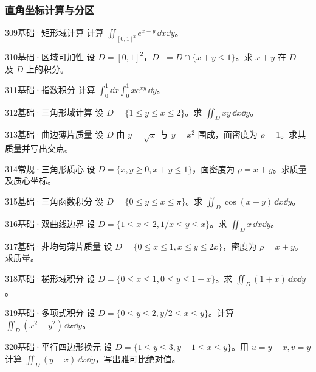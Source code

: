 \subsubsection{直角坐标计算与分区}
\begin{exercise}{309}{基础·矩形域计算}
计算 $\iint_{[0,1]^2}e^{x-y}\,\dd x\dd y$。
\end{exercise}
\begin{exercise}{310}{基础·区域可加性}
设 $D=[0,1]^2$，$D_-=D\cap\{x+y\leq1\}$。求 $x+y$ 在 $D_-$ 及 $D$ 上的积分。
\end{exercise}
\begin{exercise}{311}{基础·指数积分}
计算 $\int_0^1\dd x\int_0^1xe^{xy}\,\dd y$。
\end{exercise}
\begin{exercise}{312}{基础·三角形域计算}
设 $D=\{1\leq y\leq x\leq2\}$。求 $\iint_Dxy\,\dd x\dd y$。
\end{exercise}
\begin{exercise}{313}{基础·曲边薄片质量}
设 $D$ 由 $y=\sqrt{x}$ 与 $y=x^2$ 围成，面密度为 $\rho=1$。求其质量并写出交点。
\end{exercise}
\begin{exercise}{314}{常规·三角形质心}
设 $D=\{x,y\geq0,x+y\leq1\}$，面密度为 $\rho=x+y$。求质量及质心坐标。
\end{exercise}
\begin{exercise}{315}{基础·三角函数积分}
设 $D=\{0\leq y\leq x\leq\pi\}$。求 $\iint_D\cos(x+y)\,\dd x\dd y$。
\end{exercise}
\begin{exercise}{316}{基础·双曲线边界}
设 $D=\{1\leq x\leq2,1/x\leq y\leq x\}$。求 $\iint_D x\,\dd x\dd y$。
\end{exercise}
\begin{exercise}{317}{基础·非均匀薄片质量}
设 $D=\{0\leq x\leq1,x\leq y\leq2x\}$，密度为 $\rho=x+y$。求质量。
\end{exercise}
\begin{exercise}{318}{基础·梯形域积分}
设 $D=\{0\leq x\leq1,0\leq y\leq1+x\}$。求 $\iint_D(1+x)\,\dd x\dd y$。
\end{exercise}
\begin{exercise}{319}{基础·多项式积分}
设 $D=\{0\leq y\leq2,y/2\leq x\leq y\}$。计算 $\iint_D(x^2+y^2)\,\dd x\dd y$。
\end{exercise}
\begin{exercise}{320}{基础·平行四边形换元}
设 $D=\{1\leq y\leq3,y-1\leq x\leq y\}$。用 $u=y-x,v=y$ 计算 $\iint_D(y-x)\,\dd x\dd y$，写出雅可比绝对值。
\end{exercise}
